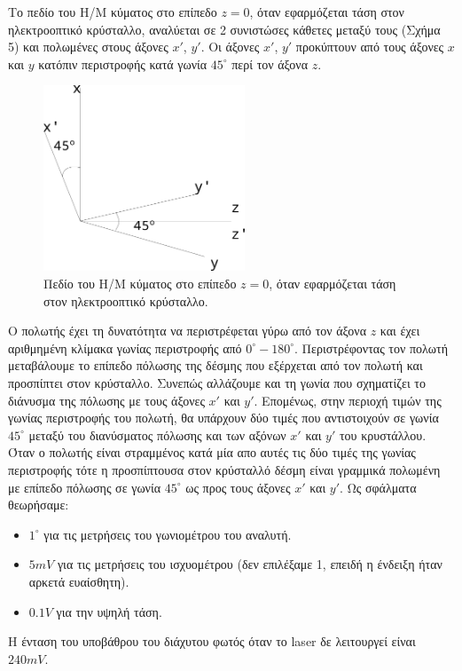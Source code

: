 \documentclass[a4paper,11pt,titlepage]{article}
\newcommand{\degrees}{^{\circ}}
\begin{document}
Το πεδίο του Η/Μ κύματος στο επίπεδο $z=0$, όταν εφαρμόζεται τάση στον ηλεκτροοπτικό κρύσταλλο, αναλύεται σε 2 συνιστώσες κάθετες μεταξύ τους (Σχήμα 5) και πολωμένες στους άξονες $x'$, $y'$. Οι άξονες $x'$, $y'$ προκύπτουν από τους άξονες $x$ και $y$ κατόπιν περιστροφής κατά γωνία $45\degrees$ περί τον άξονα $z$.

\begin{figure} [hp]
\centering
\includegraphics[width=60mm]{aksones.png}
\caption{Πεδίο του Η/Μ κύματος στο επίπεδο $z=0$, όταν εφαρμόζεται τάση στον ηλεκτροοπτικό κρύσταλλο.}
\end{figure}

Ο πολωτής έχει τη δυνατότητα να περιστρέφεται γύρω από τον άξονα $z$ και έχει αριθμημένη κλίμακα γωνίας περιστροφής από $0\degrees - 180\degrees$. Περιστρέφοντας τον πολωτή μεταβάλουμε το επίπεδο πόλωσης της δέσμης που εξέρχεται από τον πολωτή και προσπίπτει στον κρύσταλλο. Συνεπώς αλλάζουμε και τη γωνία που σχηματίζει το διάνυσμα της πόλωσης με τους άξονες $x'$ και $y'$. Επομένως, στην περιοχή τιμών της γωνίας περιστροφής του πολωτή, θα υπάρχουν δύο τιμές που αντιστοιχούν σε γωνία $45\degrees$ μεταξύ του διανύσματος πόλωσης και των αξόνων $x'$ και $y'$ του κρυστάλλου. Όταν ο πολωτής είναι στραμμένος κατά μία απο αυτές τις δύο τιμές της γωνίας περιστροφής τότε η προσπίπτουσα στον κρύσταλλό δέσμη είναι γραμμικά πολωμένη με επίπεδο πόλωσης σε γωνία $45\degrees$ ως προς τους άξονες $x'$ και $y'$. 
\newpage
Ως σφάλματα θεωρήσαμε:

\begin{itemize}
\item $1\degrees$ για τις μετρήσεις του γωνιομέτρου του αναλυτή.
\item $5 mV$ για τις μετρήσεις του ισχυομέτρου (δεν επιλέξαμε 1, επειδή η ένδειξη ήταν αρκετά ευαίσθητη).
\item $0.1 V$ για την υψηλή τάση.
\end{itemize}

Η ένταση του υποβάθρου του διάχυτου φωτός όταν το laser δε λειτουργεί είναι $240mV$.
\end{document}
